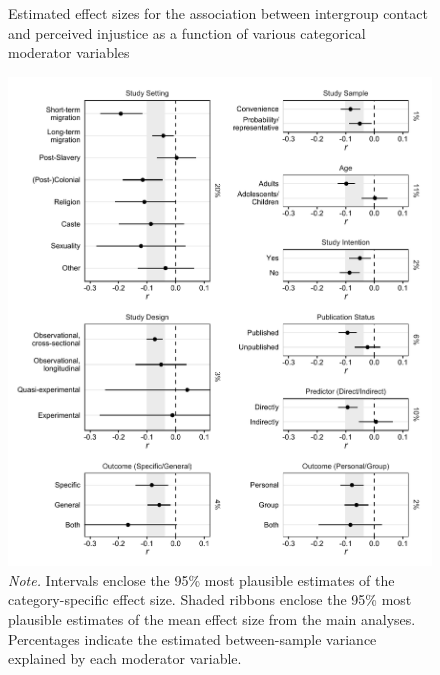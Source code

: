 \documentclass[12pt, letterpaper]{article}
\begin{document}
\begin{figure}
\centering
\caption{Estimated effect sizes for the association between intergroup contact and perceived injustice as a function of various categorical moderator variables}
\includegraphics[scale=1]{../figures/figure-4}
\caption*{\textit{Note.} Intervals enclose the 95\% most plausible estimates of the category-specific effect size. Shaded ribbons enclose the 95\% most plausible estimates of the mean effect size from the main analyses. Percentages indicate the estimated between-sample variance explained by each moderator variable.}
\label{fig:f4}
\end{figure}
\end{document}

